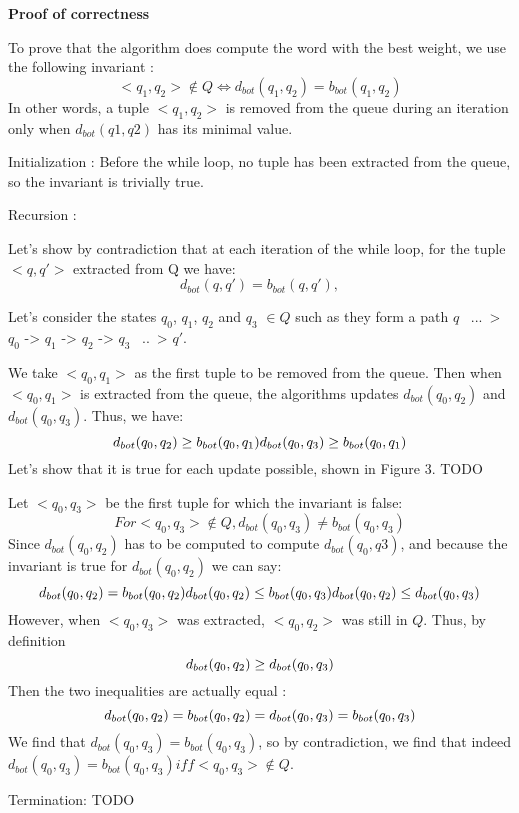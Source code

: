 \textbf{Proof of correctness}

To prove that the algorithm does compute the word with the best weight, we use the following invariant :
$$
<q_1, q_2> \notin Q \iff d_{bot} (q_1, q_2) = b_{bot} (q_1, q_2)
$$
In other words, a tuple $<q_1, q_2>$ is removed from the queue during an iteration only when $d_{bot}(q1, q2)$ has its minimal value.

Initialization : Before the while loop, no tuple has been extracted from the queue, so the invariant is trivially true.

Recursion : 

Let's show by contradiction that at each iteration of the while loop, for the tuple $<q, q'>$ extracted from Q we have:
$$
d_{bot}(q, q') = b_{bot}(q, q'), 
$$


Let's consider the states $q_0$, $q_1$, $q_2$ and $q_3$ $\in Q$ such as they form a path $q$ ~...~>$q_0$ -> $q_1$ -> $q_2$ -> $q_3$ ~..~> $q'$.

We take $<q_0, q_1>$ as the first tuple to be removed from the queue. Then when $<q_0, q_1>$ is extracted from the queue, the algorithms updates $d_{bot}(q_0, q_2)$ and $d_{bot}(q_0, q_3)$. Thus, we have:
$$
d_{bot}(q_0, q_2) \geq b_{bot}(q_0, q_1) \\
d_{bot}(q_0, q_3) \geq b_{bot}(q_0, q_1)
$$
Let's show that it is true for each update possible, shown in Figure 3. TODO

Let $<q_0, q_3>$ be the first tuple for which the invariant is false:
$$
For <q_0, q_3> \notin Q, d_{bot} (q_0, q_3) \neq b_{bot} (q_0, q_3)
$$
Since $d_{bot}(q_0, q_2)$ has to be computed to compute $d_{bot}(q_0, q3)$, and because the invariant is true for  $d_{bot}(q_0, q_2)$ we can say:
$$
d_{bot}(q_0, q_2) = b_{bot}(q_0, q_2) \\
d_{bot}(q_0, q_2) \leq b_{bot}(q_0, q_3) \\
\\d_{bot}(q_0, q_2) \leq d_{bot}(q_0, q_3) \\
$$
 However, when $<q_0, q_3>$ was extracted, $<q_0, q_2>$ was still in $Q$. Thus, by definition 
$$
d_{bot}(q_0, q_2) \geq d_{bot}(q_0, q_3) \\
$$
Then the two inequalities are actually equal : 
$$
d_{bot}(q_0, q_2) = b_{bot}(q_0, q_2) = d_{bot}(q_0, q_3) = b_{bot}(q_0, q_3) \\
$$
We find that $d_{bot}(q_0, q_3) = b_{bot}(q_0, q_3)$, so by contradiction, we find that indeed $d_{bot}(q_0, q_3) = b_{bot}(q_0, q_3) iff <q_0, q_3> \notin Q$.


Termination: TODO 